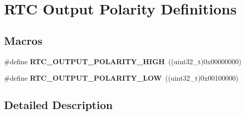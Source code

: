 \hypertarget{group___r_t_c___output___polarity___definitions}{}\section{R\+TC Output Polarity Definitions}
\label{group___r_t_c___output___polarity___definitions}
\subsection*{Macros}
\begin{DoxyCompactItemize}
\item 
\#define {\bfseries R\+T\+C\+\_\+\+O\+U\+T\+P\+U\+T\+\_\+\+P\+O\+L\+A\+R\+I\+T\+Y\+\_\+\+H\+I\+GH}~((uint32\+\_\+t)0x00000000)\hypertarget{group___r_t_c___output___polarity___definitions_ga093c938e6067080b264878bc99a43dd5}{}\label{group___r_t_c___output___polarity___definitions_ga093c938e6067080b264878bc99a43dd5}

\item 
\#define {\bfseries R\+T\+C\+\_\+\+O\+U\+T\+P\+U\+T\+\_\+\+P\+O\+L\+A\+R\+I\+T\+Y\+\_\+\+L\+OW}~((uint32\+\_\+t)0x00100000)\hypertarget{group___r_t_c___output___polarity___definitions_ga97a5745b07442aa338c2a3b81c93048b}{}\label{group___r_t_c___output___polarity___definitions_ga97a5745b07442aa338c2a3b81c93048b}

\end{DoxyCompactItemize}


\subsection{Detailed Description}
